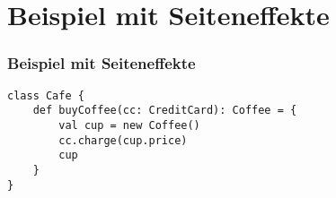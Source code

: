 	\section[Section]{Beispiel mit Seiteneffekte}
		\begin{frame}[fragile]
		\frametitle{Beispiel mit Seiteneffekte}
		\begin{lstlisting}[style=myScalastyle]
class Cafe {
	def buyCoffee(cc: CreditCard): Coffee = {
		val cup = new Coffee()
		cc.charge(cup.price)
		cup
	}
}
\end{lstlisting}
\end{frame}
		
			
